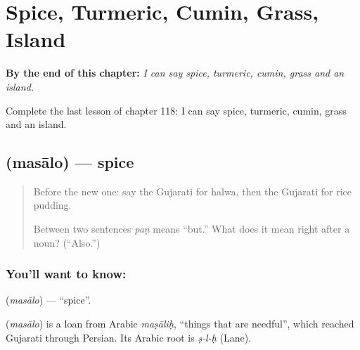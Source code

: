 
\chapter{Spice, Turmeric, Cumin, Grass, Island}
\label{ch:gu-spice-turmeric-cumin-grass-island}

\begin{chapteropening}
\textbf{By the end of this chapter:} \emph{I can say spice, turmeric, cumin, grass and an island.}

Complete the last lesson of chapter 118: I can say spice, turmeric, cumin, grass and an island.
\end{chapteropening}

\section[\texorpdfstring{\gu{મસાલો} (masālo)}{મસાલો (masālo)}]{ (masālo) — spice}

\label{lesson:GU-C118-masalo}



\begin{quote}
Before the new one: say the Gujarati for halwa, then the Gujarati for rice pudding.

Between two sentences \emph{paṇ} means \textquotedblleft{}but.\textquotedblright{} What does it mean right after a noun? (\textquotedblleft{}Also.\textquotedblright{})
\end{quote}

\subsection*{You'll want to know: }
\textbf{} (\emph{masālo}) — \textquotedblleft{}spice\textquotedblright{}.

\begin{cousinweb}
\textbf{} (\emph{masālo}) is a loan from Arabic \emph{maṣāliḥ}, \textquotedblleft{}things that are needful\textquotedblright{}, which reached Gujarati through Persian. Its Arabic root is \emph{ṣ-l-ḥ} (Lane).
\end{cousinweb}

